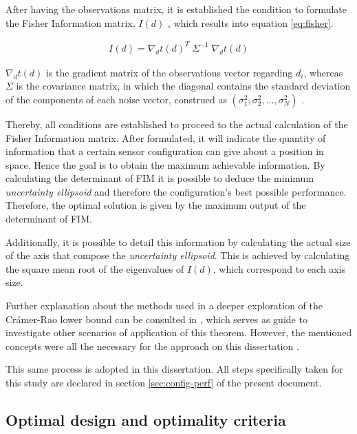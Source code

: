 After having the observations matrix, it is established the condition to formulate the Fisher Information matrix, $I(d)$ , which results into equation \ref{eq:fisher}.

\begin{eqnarray}
	I(d) = \nabla_{d}t(d)^T \; \Sigma^{-1} \; \nabla_{d}t(d)
	\label{eq:fisher}
\end{eqnarray}

$\nabla_{d}t(d)$ is the gradient matrix of the observations vector regarding $d_i$, whereas $\Sigma$ is the covariance matrix, in which the diagonal contains the standard deviation of the components of each noise vector, construed as $(\sigma_1^2 , \sigma_2^2 , ... , \sigma_N^2)$ .

Thereby, all conditions are established to proceed to the actual calculation of the Fisher Information matrix. After formulated, it will indicate the quantity of information that a certain sensor configuration can give about a position in space. Hence the goal is to obtain the maximum achievable information. By calculating the determinant of FIM it is possible to deduce the minimum \textit{uncertainty ellipsoid} and therefore the configuration's best possible performance. Therefore, the optimal solution is given by the maximum output of the determinant of FIM.

Additionally, it is possible to detail this information by calculating the actual size of the axis that compose the \textit{uncertainty ellipsoid}. This is achieved by calculating the square mean root of the eigenvalues of $I(d)$, which correspond to each axis size.

Further explanation about the methods used in a deeper exploration of the Crámer-Rao lower bound can be consulted in \cite{bishop-cramer-rao}, which serves as guide to investigate other scenarios of application of this theorem. However, the mentioned concepts were all the necessary for the approach on this dissertation .

This same process is adopted in this dissertation. All steps specifically taken for this study are declared in section \ref{sec:config-perf} of the present document.


\subsection{Optimal design and optimality criteria}	\label{sec:optimaldesign}

